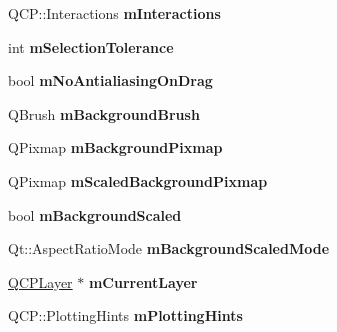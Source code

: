 \begin{DoxyCompactItemize}
\item 
\hypertarget{classQCustomPlot_ad717377ceba7493b4b32f0bcbbdf1895}{}Q\+C\+P\+::\+Interactions {\bfseries m\+Interactions}\label{classQCustomPlot_ad717377ceba7493b4b32f0bcbbdf1895}

\item 
\hypertarget{classQCustomPlot_abc36e12dd0482117ad810a800c847722}{}int {\bfseries m\+Selection\+Tolerance}\label{classQCustomPlot_abc36e12dd0482117ad810a800c847722}

\item 
\hypertarget{classQCustomPlot_ac83df968435f6b8ec79f2993ab9124e8}{}bool {\bfseries m\+No\+Antialiasing\+On\+Drag}\label{classQCustomPlot_ac83df968435f6b8ec79f2993ab9124e8}

\item 
\hypertarget{classQCustomPlot_a3aef5de4ac012178e3293248e9c63737}{}Q\+Brush {\bfseries m\+Background\+Brush}\label{classQCustomPlot_a3aef5de4ac012178e3293248e9c63737}

\item 
\hypertarget{classQCustomPlot_ae8f4677399324a78c5f8dbfb95a34f90}{}Q\+Pixmap {\bfseries m\+Background\+Pixmap}\label{classQCustomPlot_ae8f4677399324a78c5f8dbfb95a34f90}

\item 
\hypertarget{classQCustomPlot_a081bf046501d52642dc6d7e3bdb97d57}{}Q\+Pixmap {\bfseries m\+Scaled\+Background\+Pixmap}\label{classQCustomPlot_a081bf046501d52642dc6d7e3bdb97d57}

\item 
\hypertarget{classQCustomPlot_a62fe584b20680b1b2e1c7efb5c5416a5}{}bool {\bfseries m\+Background\+Scaled}\label{classQCustomPlot_a62fe584b20680b1b2e1c7efb5c5416a5}

\item 
\hypertarget{classQCustomPlot_ab82e8a5e3ad6b486f95d6da8bf49e9aa}{}Qt\+::\+Aspect\+Ratio\+Mode {\bfseries m\+Background\+Scaled\+Mode}\label{classQCustomPlot_ab82e8a5e3ad6b486f95d6da8bf49e9aa}

\item 
\hypertarget{classQCustomPlot_aa27569c92e74395af10151357d268628}{}\hyperlink{classQCPLayer}{Q\+C\+P\+Layer} $\ast$ {\bfseries m\+Current\+Layer}\label{classQCustomPlot_aa27569c92e74395af10151357d268628}

\item 
\hypertarget{classQCustomPlot_aa184197a6101a9cc5807469e1d006c9e}{}Q\+C\+P\+::\+Plotting\+Hints {\bfseries m\+Plotting\+Hints}\label{classQCustomPlot_aa184197a6101a9cc5807469e1d006c9e}


\end{DoxyCompactItemize}
